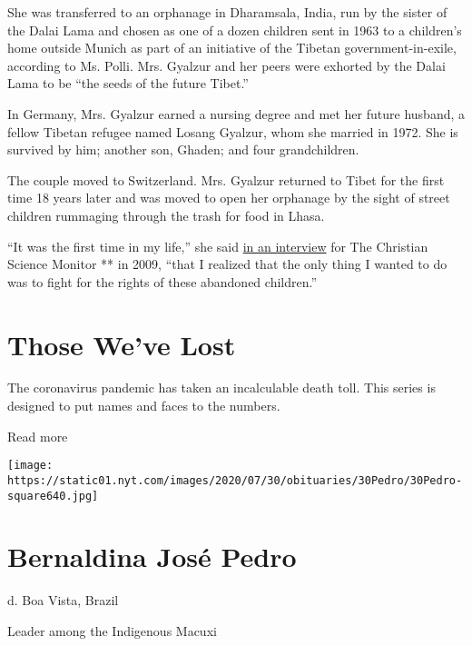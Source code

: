She was transferred to an orphanage in Dharamsala, India, run by the
sister of the Dalai Lama and chosen as one of a dozen children sent in
1963 to a children's home outside Munich as part of an initiative of the
Tibetan government-in-exile, according to Ms. Polli. Mrs. Gyalzur and
her peers were exhorted by the Dalai Lama to be ``the seeds of the
future Tibet.''

In Germany, Mrs. Gyalzur earned a nursing degree and met her future
husband, a fellow Tibetan refugee named Losang Gyalzur, whom she married
in 1972. She is survived by him; another son, Ghaden; and four
grandchildren.

The couple moved to Switzerland. Mrs. Gyalzur returned to Tibet for the
first time 18 years later and was moved to open her orphanage by the
sight of street children rummaging through the trash for food in Lhasa.

``It was the first time in my life,'' she said
\href{https://www.csmonitor.com/World/Making-a-difference/2009/1019/p07s01-lign.html}{in
an interview} for The Christian Science Monitor ** in 2009, ``that I
realized that the only thing I wanted to do was to fight for the rights
of these abandoned children.''

\href{https://www.nytimes.com/interactive/2020/obituaries/people-died-coronavirus-obituaries.html?action=click\&pgtype=Article\&state=default\&region=BELOW_MAIN_CONTENT\&context=covid_obits_promo}{}

\hypertarget{those-weve-lost}{%
\section{Those We've Lost}\label{those-weve-lost}}

The coronavirus pandemic has taken an incalculable death toll. This
series is designed to put names and faces to the numbers.

Read more

\texttt{[image: https://static01.nyt.com/images/2020/07/30/obituaries/30Pedro/30Pedro-square640.jpg]}

\hypertarget{bernaldina-josuxe9-pedro}{%
\section{Bernaldina José Pedro}\label{bernaldina-josuxe9-pedro}}

d. Boa Vista, Brazil

Leader among the Indigenous Macuxi

